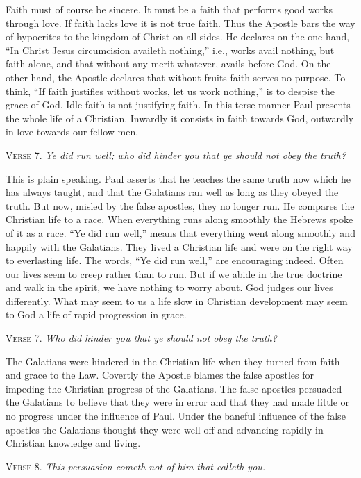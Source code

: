 Faith must of course be sincere. It must be a faith that performs good works through love. If faith lacks love it is not true faith. Thus the Apostle bars the way of hypocrites to the kingdom of Christ on all sides. He declares on the one hand, “In Christ Jesus circumcision availeth nothing,” i.e., works avail nothing, but faith alone, and that without any merit whatever, avails before God. On the other hand, the Apostle declares that without fruits faith serves no purpose. To think, “If faith justifies without works, let us work nothing,” is to despise the grace of God. Idle faith is not justifying faith. In this terse manner Paul presents the whole life of a Christian. Inwardly it consists in faith towards God, outwardly in love towards our fellow-men.

\textsc{Verse} 7. \emph{Ye did run well; who did hinder you that ye should not obey the truth?}

This is plain speaking. Paul asserts that he teaches the same truth now which he has always taught, and that the Galatians ran well as long as they obeyed the truth. But now, misled by the false apostles, they no longer run. He compares the Christian life to a race. When everything runs along smoothly the Hebrews spoke of it as a race. “Ye did run well,” means that everything went along smoothly and happily with the Galatians. They lived a Christian life and were on the right way to everlasting life. The words, “Ye did run well,” are encouraging indeed. Often our lives seem to creep rather than to run. But if we abide in the true doctrine and walk in the spirit, we have nothing to worry about. God judges our lives differently. What may seem to us a life slow in Christian development may seem to God a life of rapid progression in grace.

\textsc{Verse} 7. \emph{Who did hinder you that ye should not obey the truth?}

The Galatians were hindered in the Christian life when they turned from faith and grace to the Law. Covertly the Apostle blames the false apostles for impeding the Christian progress of the Galatians. The false apostles persuaded the Galatians to believe that they were in error and that they had made little or no progress under the influence of Paul. Under the baneful influence of the false apostles the Galatians thought they were well off and advancing rapidly in Christian knowledge and living.

\textsc{Verse} 8. \emph{This persuasion cometh not of him that calleth you.}

